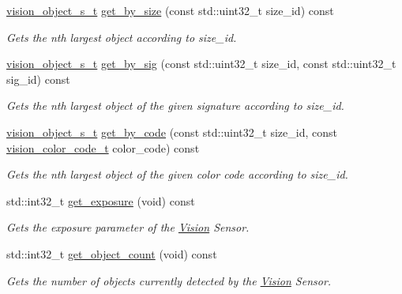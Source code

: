 \begin{DoxyCompactItemize}
\mbox{\hyperlink{vision_8h_ae619120558539c13e53b5a6f42fb4375}{vision\+\_\+object\+\_\+s\+\_\+t}} \mbox{\hyperlink{classpros_1_1Vision_aa5cca450a5b80278a97bbea786195733}{get\+\_\+by\+\_\+size}} (const std\+::uint32\+\_\+t size\+\_\+id) const
\begin{DoxyCompactList}\small\item\em Gets the nth largest object according to size\+\_\+id. \end{DoxyCompactList}\item 
\mbox{\hyperlink{vision_8h_ae619120558539c13e53b5a6f42fb4375}{vision\+\_\+object\+\_\+s\+\_\+t}} \mbox{\hyperlink{classpros_1_1Vision_a10fd89ed3c5e8fe5ce25046a877c7d84}{get\+\_\+by\+\_\+sig}} (const std\+::uint32\+\_\+t size\+\_\+id, const std\+::uint32\+\_\+t sig\+\_\+id) const
\begin{DoxyCompactList}\small\item\em Gets the nth largest object of the given signature according to size\+\_\+id. \end{DoxyCompactList}\item 
\mbox{\hyperlink{vision_8h_ae619120558539c13e53b5a6f42fb4375}{vision\+\_\+object\+\_\+s\+\_\+t}} \mbox{\hyperlink{classpros_1_1Vision_a4b96f92a2ae2f29fd37709958f48e514}{get\+\_\+by\+\_\+code}} (const std\+::uint32\+\_\+t size\+\_\+id, const \mbox{\hyperlink{vision_8h_a71f2011a47e95558bb534b05c16c7f2b}{vision\+\_\+color\+\_\+code\+\_\+t}} color\+\_\+code) const
\begin{DoxyCompactList}\small\item\em Gets the nth largest object of the given color code according to size\+\_\+id. \end{DoxyCompactList}\item 
std\+::int32\+\_\+t \mbox{\hyperlink{classpros_1_1Vision_a80552b2897b8edcdb68bc56477213f2e}{get\+\_\+exposure}} (void) const
\begin{DoxyCompactList}\small\item\em Gets the exposure parameter of the \mbox{\hyperlink{classpros_1_1Vision}{Vision}} Sensor. \end{DoxyCompactList}\item 
std\+::int32\+\_\+t \mbox{\hyperlink{classpros_1_1Vision_a73869f85b3d2e468ffc51957d80f5a75}{get\+\_\+object\+\_\+count}} (void) const
\begin{DoxyCompactList}\small\item\em Gets the number of objects currently detected by the \mbox{\hyperlink{classpros_1_1Vision}{Vision}} Sensor. \end{DoxyCompactList}\item 

\end{DoxyCompactItemize}

